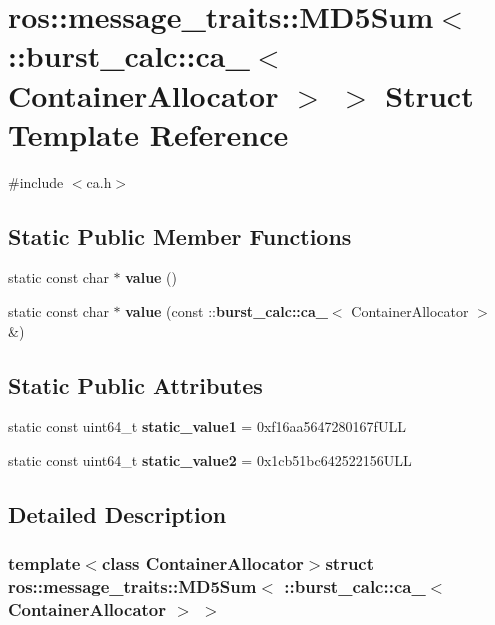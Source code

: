 \section{ros\-:\-:message\-\_\-traits\-:\-:\-M\-D5\-Sum$<$ \-:\-:burst\-\_\-calc\-:\-:ca\-\_\-$<$ \-Container\-Allocator $>$ $>$ \-Struct \-Template \-Reference}
\label{structros_1_1message__traits_1_1MD5Sum_3_01_1_1burst__calc_1_1ca___3_01ContainerAllocator_01_4_01_4}


{\ttfamily \#include $<$ca.\-h$>$}

\subsection*{\-Static \-Public \-Member \-Functions}
\begin{DoxyCompactItemize}
\item 
static const char $\ast$ {\bf value} ()
\item 
static const char $\ast$ {\bf value} (const \-::{\bf burst\-\_\-calc\-::ca\-\_\-}$<$ \-Container\-Allocator $>$ \&)
\end{DoxyCompactItemize}
\subsection*{\-Static \-Public \-Attributes}
\begin{DoxyCompactItemize}
\item 
static const uint64\-\_\-t {\bf static\-\_\-value1} = 0xf16aa5647280167f\-U\-L\-L
\item 
static const uint64\-\_\-t {\bf static\-\_\-value2} = 0x1cb51bc642522156\-U\-L\-L
\end{DoxyCompactItemize}


\subsection{\-Detailed \-Description}
\subsubsection*{template$<$class Container\-Allocator$>$struct ros\-::message\-\_\-traits\-::\-M\-D5\-Sum$<$ \-::burst\-\_\-calc\-::ca\-\_\-$<$ Container\-Allocator $>$ $>$}



